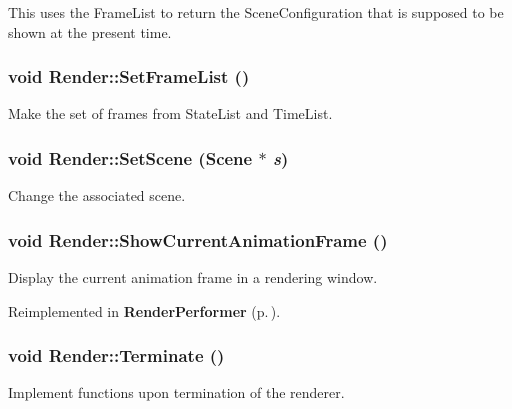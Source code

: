 This uses the Frame\-List to return the Scene\-Configuration that is supposed to be shown at the present time.

\subsubsection{\setlength{\rightskip}{0pt plus 5cm}void Render::Set\-Frame\-List ()\hspace{0.3cm}{\tt  [virtual]}}\label{class_Render_a9}


Make the set of frames from State\-List and Time\-List.

\subsubsection{\setlength{\rightskip}{0pt plus 5cm}void Render::Set\-Scene ({\bf Scene} $\ast$ {\em s})}\label{class_Render_a14}


Change the associated scene.

\subsubsection{\setlength{\rightskip}{0pt plus 5cm}void Render::Show\-Current\-Animation\-Frame ()\hspace{0.3cm}{\tt  [inline, protected, virtual]}}\label{class_Render_b1}


Display the current animation frame in a rendering window.



Reimplemented in {\bf Render\-Performer} {\rm (p.\,\pageref{class_RenderPerformer_b0})}.
\subsubsection{\setlength{\rightskip}{0pt plus 5cm}void Render::Terminate ()\hspace{0.3cm}{\tt  [inline, virtual]}}\label{class_Render_a8}


Implement functions upon termination of the renderer.



